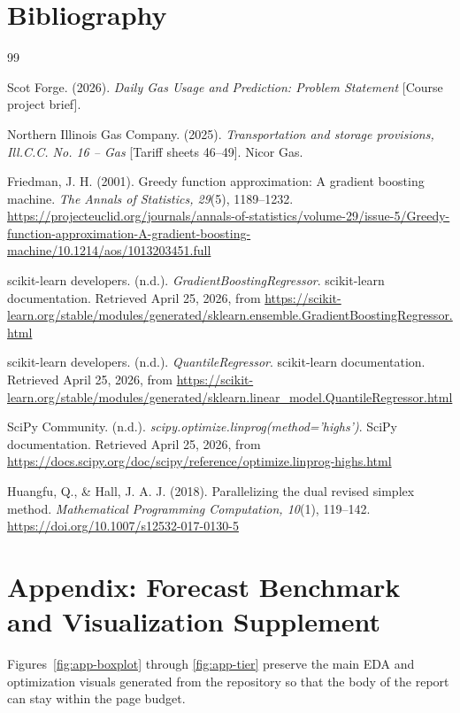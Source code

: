 \documentclass[10pt]{article}
\begin{document}
\clearpage
\section*{Bibliography}
\begin{thebibliography}{99}

Scot Forge. (2026). \textit{Daily Gas Usage and Prediction: Problem Statement} [Course project brief].

Northern Illinois Gas Company. (2025). \textit{Transportation and storage provisions, Ill.C.C. No. 16 -- Gas} [Tariff sheets 46--49]. Nicor Gas.

Friedman, J. H. (2001). Greedy function approximation: A gradient boosting machine. \textit{The Annals of Statistics, 29}(5), 1189--1232. \url{https://projecteuclid.org/journals/annals-of-statistics/volume-29/issue-5/Greedy-function-approximation-A-gradient-boosting-machine/10.1214/aos/1013203451.full}

scikit-learn developers. (n.d.). \textit{GradientBoostingRegressor}. scikit-learn documentation. Retrieved April 25, 2026, from \url{https://scikit-learn.org/stable/modules/generated/sklearn.ensemble.GradientBoostingRegressor.html}

scikit-learn developers. (n.d.). \textit{QuantileRegressor}. scikit-learn documentation. Retrieved April 25, 2026, from \url{https://scikit-learn.org/stable/modules/generated/sklearn.linear_model.QuantileRegressor.html}

SciPy Community. (n.d.). \textit{scipy.optimize.linprog(method='highs')}. SciPy documentation. Retrieved April 25, 2026, from \url{https://docs.scipy.org/doc/scipy/reference/optimize.linprog-highs.html}

Huangfu, Q., \& Hall, J. A. J. (2018). Parallelizing the dual revised simplex method. \textit{Mathematical Programming Computation, 10}(1), 119--142. \url{https://doi.org/10.1007/s12532-017-0130-5}

\end{thebibliography}

\clearpage
\appendix

\section{Appendix: Forecast Benchmark and Visualization Supplement}
Figures~\ref{fig:app-boxplot} through \ref{fig:app-tier} preserve the main EDA and optimization visuals generated from the repository so that the body of the report can stay within the page budget.
\end{document}

